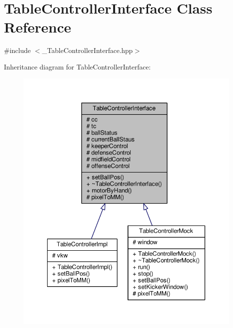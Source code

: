 \hypertarget{class_table_controller_interface}{}\section{Table\+Controller\+Interface Class Reference}
\label{class_table_controller_interface}


{\ttfamily \#include $<$\+\_\+\+Table\+Controller\+Interface.\+hpp$>$}



Inheritance diagram for Table\+Controller\+Interface\+:\nopagebreak
\begin{figure}[H]
\begin{center}
\leavevmode
\includegraphics[width=342pt]{class_table_controller_interface__inherit__graph}
\end{center}
\end{figure}


